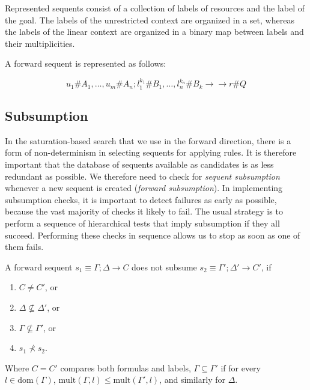 \documentclass{article}
\theoremstyle{definition}
\newcommand{\fneuseqsymb}{
  \mathrel{\longrightarrow\!\!\!\!\!\!\!\!\longrightarrow}}
\begin{document}
Represented sequents consist of a collection of labels of resources and the
label of the goal. The labels of the unrestricted context are organized in a
set, whereas the labels of the linear context are organized in a binary map
between labels and their multiplicities.

\begin{definition}
  A forward sequent is represented as follows:

  \[
    u_1 \# A_1, \dots, u_m \# A_n ; l_1^{k_1} \# B_1, \dots, l_n^{k_n} \# B_k
    \fneuseqsymb r \# Q
  \]
\end{definition}

\subsection{Subsumption}

In the saturation-based search that we use in the forward direction, there is a
form of non-determinism in selecting sequents for applying rules. It is
therefore important that the database of sequents available as candidates is as
less redundant as possible. We therefore need to check for \emph{sequent
  subsumption} whenever a new sequent is created (\emph{forward
  subsumption}). In implementing subsumption checks, it is important to detect
failures as early as possible, because the vast majority of checks it likely to
fail. The usual strategy is to perform a sequence of hierarchical tests that
imply subsumption if they all succeed. Performing these checks in sequence
allows us to stop as soon as one of them fails.

\begin{definition}
  A forward sequent $s_1 \equiv \Gamma; \Delta \longrightarrow C$ does not
  subsume $s_2 \equiv \Gamma'; \Delta' \longrightarrow C'$, if

  \begin{enumerate}
  \item $C \neq C'$, or
  \item $\Delta \not \subseteq \Delta'$, or
  \item $\Gamma \not \subseteq \Gamma'$, or
  \item $s_1 \not \prec s_2$.
  \end{enumerate}

  Where $C = C'$ compares both formulas and labels, $\Gamma \subseteq \Gamma'$
  if for every $l \in \mathrm{dom}(\Gamma)$,
  $\mathrm{mult}(\Gamma, l) \leq \mathrm{mult}(\Gamma', l)$, and similarly for
  $\Delta$.
\end{definition}
\end{document}
